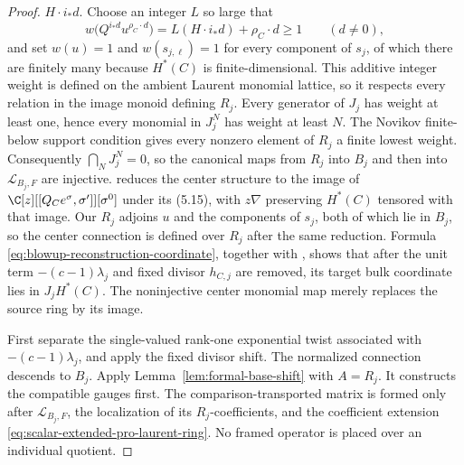 \begin{proof}
\(H\cdot i_*d\).  Choose an integer \(L\) so large that
\[
 w\bigl(Q^{i_*d}u^{\rho_C\cdot d}\bigr)
   =L(H\cdot i_*d)+\rho_C\cdot d\ge1
 \qquad(d\ne0),
\]
and set \(w(u)=1\) and \(w(s_{j,\ell})=1\) for every component of \(s_j\),
of which there are finitely many because \(H^*(C)\) is finite-dimensional.
This additive integer weight is defined on the ambient Laurent monomial
lattice, so it respects every relation in the image monoid defining \(R_j\).
Every generator of \(J_j\) has weight at least one, hence every monomial in
\(J_j^N\) has weight at least \(N\).  The Novikov finite-below support
condition gives every nonzero element of \(R_j\) a finite lowest weight.
Consequently
\(\bigcap_NJ_j^N=0\), so the canonical maps from \(R_j\) into \(B_j\) and
then into \(\mathscr L_{B_j,F}\) are injective.
\cite[Remark~5.6]{IritaniBlowup} reduces the center structure to the image of
\(\C[z][[Q_Ce^\sigma,\sigma']][\sigma^0]\) under its (5.15), with \(z\nabla\)
preserving \(H^*(C)\) tensored with that image.  Our \(R_j\) adjoins \(u\)
and the components of \(s_j\), both of which lie in \(B_j\), so the center
connection is defined over \(R_j\) after the same reduction.
Formula \eqref{eq:blowup-reconstruction-coordinate}, together with
\cite[(5.45), (5.47), and the initial asymptotics (5.27)--(5.30)]{IritaniBlowup},
shows that after the unit term \(-(c-1)\lambda_j\) and fixed divisor
\(h_{C,j}\) are removed, its target bulk coordinate lies in
\(J_jH^*(C)\).  The noninjective center monomial map merely replaces the
source ring by its image.

First separate the single-valued rank-one exponential twist associated with
\(-(c-1)\lambda_j\), and apply the fixed divisor shift.  The normalized
connection descends to \(B_j\).  Apply
Lemma~\ref{lem:formal-base-shift} with \(A=R_j\).  It constructs the
compatible gauges first.  The comparison-transported matrix is formed only
after \(\mathscr L_{B_j,F}\), the localization of its \(R_j\)-coefficients,
and the coefficient extension
\eqref{eq:scalar-extended-pro-laurent-ring}.  No framed operator is placed
over an individual quotient.


\end{proof}
